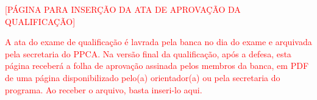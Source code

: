 \begin{titlepage}

    \begin{center}
    \textcolor{red}{[PÁGINA PARA INSERÇÃO DA ATA DE APROVAÇÃO DA QUALIFICAÇÃO]}

    \textcolor{red}{A ata do exame de qualificação é lavrada pela banca no dia do exame e arquivada pela secretaria do PPCA. Na versão final da qualificação, após a defesa, esta página receberá a folha de aprovação assinada pelos membros da banca, em PDF de uma página disponibilizado pelo(a) orientador(a) ou pela secretaria do programa. Ao receber o arquivo, basta inseri-lo aqui.}
    \end{center}

\end{titlepage}